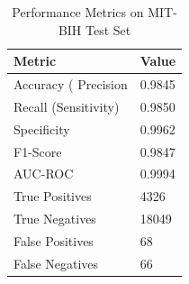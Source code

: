 \begin{table}
\caption{Performance Metrics on MIT-BIH Test Set}
\label{tab:results}
\begin{tabular}{ll}
\toprule
Metric & Value \\
\midrule
Accuracy (%
Precision & 0.9845 \\
Recall (Sensitivity) & 0.9850 \\
Specificity & 0.9962 \\
F1-Score & 0.9847 \\
AUC-ROC & 0.9994 \\
True Positives & 4326 \\
True Negatives & 18049 \\
False Positives & 68 \\
False Negatives & 66 \\
\bottomrule
\end{tabular}
\end{table}
